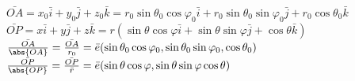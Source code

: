 $\bar{OA} = x_0 \bar i + y_0 \bar j + z_0 \bar k = r_0 \sin \theta _0 \cos \varphi_0 \bar i + r_0 \sin \theta_0 \sin \varphi_0 \bar j + r_0 \cos \theta_0 \bar k$\\
$\bar{OP} = x \bar i + y \bar j + z \bar k = r (\sin \theta \cos \varphi \bar i + \sin \theta \sin \varphi \bar j + \cos \theta \bar k)$\\
$\frac{\bar{OA}}{\abs{OA}} = \frac{\bar{OA}}{r_0} = \bar e (\sin \theta_0 \cos \varphi_0, \sin \theta_0 \sin \varphi_0, \cos \theta_0)$\\
$\frac{\bar{OP}}{\abs{OP}} = \frac{\bar{OP}}{\bar r} = \bar e (\sin \theta \cos \varphi, \sin \theta \sin \varphi \cos \theta)$\\
\newpage